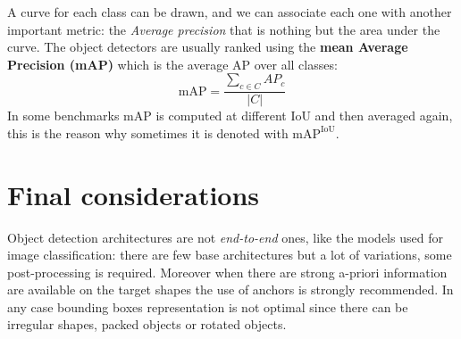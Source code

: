 A curve for each class can be drawn, and we can associate each one with another important metric: the \textit{Average precision} that is nothing but the area under the curve. The object detectors are usually ranked using the \textbf{mean Average Precision (mAP)} which is the average AP over all classes: 
\begin{equation}
    \text{mAP}=\frac{\sum_{c\in{C}}{AP_{c}}}{\vert C \vert }
\end{equation}
In some benchmarks mAP is computed at different IoU and then averaged again, this is the reason why sometimes it is denoted with $\text{mAP}^{\text{IoU}}$. 

\section{Final considerations}
Object detection architectures are not \textit{end-to-end} ones, like the models used for image classification: there are few base architectures but a lot of variations, some post-processing is required. Moreover when there are strong a-priori information are available on the target shapes the use of anchors is strongly recommended. In any case bounding boxes representation is not optimal since there can be irregular shapes, packed objects or rotated objects.

